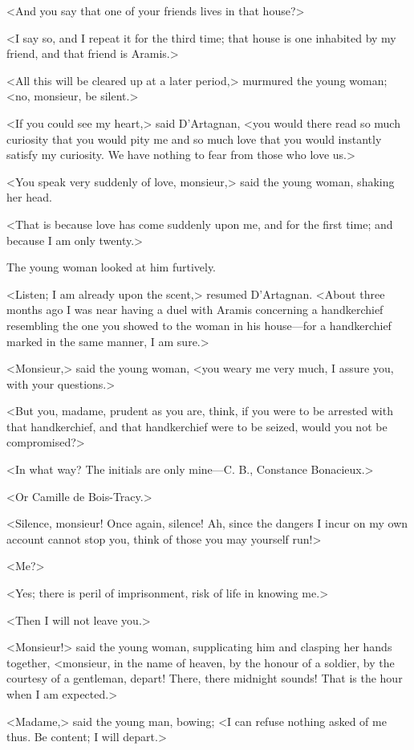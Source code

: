 <And you say that one of your friends lives in that house?> 

<I say so, and I repeat it for the third time; that house is one inhabited by my friend, and that friend is Aramis.> 

<All this will be cleared up at a later period,> murmured the young woman; <no, monsieur, be silent.> 

<If you could see my heart,> said D'Artagnan, <you would there read so much curiosity that you would pity me and so much love that you would instantly satisfy my curiosity. We have nothing to fear from those who love us.> 

<You speak very suddenly of love, monsieur,> said the young woman, shaking her head. 

<That is because love has come suddenly upon me, and for the first time; and because I am only twenty.> 

The young woman looked at him furtively. 

<Listen; I am already upon the scent,> resumed D'Artagnan. <About three months ago I was near having a duel with Aramis concerning a handkerchief resembling the one you showed to the woman in his house—for a handkerchief marked in the same manner, I am sure.> 

<Monsieur,> said the young woman, <you weary me very much, I assure you, with your questions.> 

<But you, madame, prudent as you are, think, if you were to be arrested with that handkerchief, and that handkerchief were to be seized, would you not be compromised?> 

<In what way? The initials are only mine—C. B., Constance Bonacieux.> 

<Or Camille de Bois-Tracy.> 

<Silence, monsieur! Once again, silence! Ah, since the dangers I incur on my own account cannot stop you, think of those you may yourself run!> 

<Me?> 

<Yes; there is peril of imprisonment, risk of life in knowing me.> 

<Then I will not leave you.> 

<Monsieur!> said the young woman, supplicating him and clasping her hands together, <monsieur, in the name of heaven, by the honour of a soldier, by the courtesy of a gentleman, depart! There, there midnight sounds! That is the hour when I am expected.> 

<Madame,> said the young man, bowing; <I can refuse nothing asked of me thus. Be content; I will depart.> 


